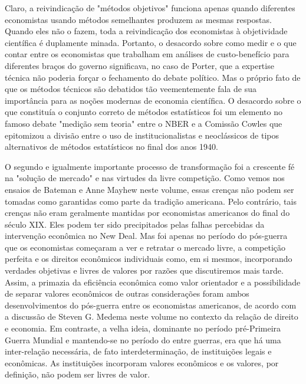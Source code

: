 \documentclass[a4paper,12pt]{article}[abntex2]
\begin{document}
Claro, a reivindicação de "métodos objetivos" funciona apenas quando diferentes economistas usando métodos semelhantes produzem as mesmas respostas. Quando eles não o fazem, toda a reivindicação dos economistas à objetividade científica é duplamente minada. Portanto, o desacordo sobre como medir e o que contar entre os economistas que trabalham em análises de custo-benefício para diferentes braços do governo significava, no caso de Porter, que a expertise técnica não poderia forçar o fechamento do debate político. Mas o próprio fato de que os métodos técnicos são debatidos tão veementemente fala de sua importância para as noções modernas de economia científica. O desacordo sobre o que constituía o conjunto correto de métodos estatísticos foi um elemento no famoso debate "medição sem teoria" entre o NBER e a Comissão Cowles que epitomizou a divisão entre o uso de institucionalistas e neoclássicos de tipos alternativos de métodos estatísticos no final dos anos 1940.

O segundo e igualmente importante processo de transformação foi a crescente fé na "solução de mercado" e nas virtudes da livre competição. Como vemos nos ensaios de Bateman e Anne Mayhew neste volume, essas crenças não podem ser tomadas como garantidas como parte da tradição americana. Pelo contrário, tais crenças não eram geralmente mantidas por economistas americanos do final do século XIX. Eles podem ter sido precipitados pelas falhas percebidas da intervenção econômica no New Deal. Mas foi apenas no período do pós-guerra que os economistas começaram a ver e retratar o mercado livre, a competição perfeita e os direitos econômicos individuais como, em si mesmos, incorporando verdades objetivas e livres de valores por razões que discutiremos mais tarde. Assim, a primazia da eficiência econômica como valor orientador e a possibilidade de separar valores econômicos de outras considerações foram ambos desenvolvimentos do pós-guerra entre os economistas americanos, de acordo com a discussão de Steven G. Medema neste volume no contexto da relação de direito e economia. Em contraste, a velha ideia, dominante no período pré-Primeira Guerra Mundial e mantendo-se no período do entre guerras, era que há uma inter-relação necessária, de fato interdeterminação, de instituições legais e econômicas. As instituições incorporam valores econômicos e os valores, por definição, não podem ser livres de valor.
\end{document}
